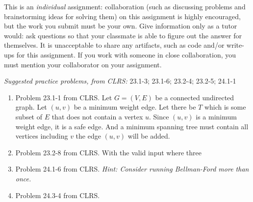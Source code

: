 \documentclass[letterpaper,11pt]{article}
\begin{document}


This is an \emph{individual} assignment: collaboration (such as discussing problems and brainstorming ideas for solving them) on this assignment is highly encouraged, but the work you submit must be your own. Give information only as a tutor would: ask questions so that your classmate is able to figure out the answer for themselves. It is unacceptable to share any artifacts, such as code and/or write-ups for this assignment. If you work with someone in close collaboration, you must mention your collaborator on your assignment.

\emph{Suggested practice problems, from CLRS:} 23.1-3; 23.1-6; 23.2-4; 23.2-5; 24.1-1

\begin{enumerate}
\item Problem 23.1-1 from CLRS.
Let $G = (V,E)$ be a connected undirected graph. Let $(u,v)$ be a minimum weight edge. Let there be $T$ which is some subset of $E$ that does not contain a vertex $u$. Since $(u,v)$ is a minimum weight edge, it is a safe edge. And a minimum spanning tree must contain all vertices including $v$ the edge $(u,v)$ will be added.
\item Problem 23.2-8 from CLRS.
With the valid input where three 
\item Problem 24.1-6 from CLRS. \emph{Hint: Consider running Bellman-Ford more than once.}
\item Problem 24.3-4 from CLRS.

\end{enumerate}
\end{document}
